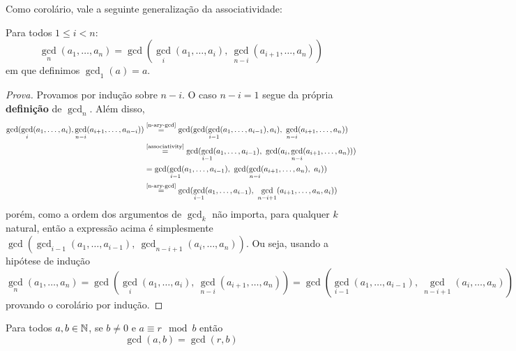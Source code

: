 \documentclass{article}
\begin{document}
Como corolário, vale a seguinte generalização da associatividade:
\begin{corollary}\label{complete-associativity}
    Para todos \(1 \leq i < n\):
    \[\gcd_n(a_1, \dotsc, a_n) = \gcd(\gcd_{i}(a_1, \dotsc, a_{i}),\ \gcd_{n-i}(a_{i+1}, \dotsc, a_n))\]
    em que definimos \(\gcd_1(a) = a\).
\end{corollary}
\begin{proof}[Prova]
    Provamos por indução sobre \(n - i\). O caso \(n - i = 1\) segue da própria \textbf{definição} de \(\gcd_n\). Além disso,
    \begin{align*}
        \gcd(
            \gcd_i(a_1, \dotsc, a_i), 
            \gcd_{n - i}(a_{i+1}, \dotsc, a_{n-i})
        ) 
        &\overset{\text{\cref{n-ary-gcd}}}{=} 
        \gcd(
            \gcd(\gcd_{i-1}(a_1, \dotsc, a_{i-1}), a_i), \
            \gcd_{n-i}(a_{i+1}, \dotsc, a_n)
        )  
        \\
        &\overset{\text{\cref{associativity}}}{=} 
        \gcd(
            \gcd_{i-1}(a_1, \dotsc, a_{i-1}), \
            \gcd(
                a_i, 
                \gcd_{n-i}(a_{i+1}, \dotsc, a_n)
            )
        )
        \\
        &=
        \gcd(
            \gcd_{i-1}(a_1, \dotsc, a_{i-1}),\
            \gcd(
                \gcd_{n-i}(a_{i+1}, \dotsc, a_{n}),\
                a_i
            )
        )
        \\ 
        &\overset{\text{\cref{n-ary-gcd}}}{=} 
        \gcd(
            \gcd_{i-1}(a_1, \dotsc, a_{i-1}),\
            \gcd_{n-i + 1}(a_{i+1}, \dotsc, a_n, a_i)
        )
    \end{align*} 
    porém, como a ordem dos argumentos de \(\gcd_k\) não importa, para qualquer \(k\) natural, então a expressão acima é simplesmente \(\gcd(
        \gcd_{i-1}(a_1, \dotsc, a_{i-1}),\ 
        \gcd_{n-i+1}(a_i,\dotsc,a_n)
    )\). Ou seja, usando a hipótese de indução
    \[\gcd_n(a_1, \dotsc, a_n) = \gcd(
        \gcd_i(a_1, \dotsc, a_i), \
        \gcd_{n-i}(a_{i+1}, \dotsc, a_n)
    ) 
    = 
    \gcd(
        \gcd_{i-1}(a_1, \dotsc, a_{i-1}),\ 
        \gcd_{n-i+1}(a_i,\dotsc,a_n)
    )\]     
    provando o corolário por indução.
\end{proof}

\begin{lemma}\label{gcd-remainder}
    Para todos \(a, b \in \mathbb{N}\), se \(b \neq 0\) e \(a \equiv r \mod b\) então
    \[\gcd(a, b) = \gcd(r, b)\]
\end{lemma}
\end{document}
